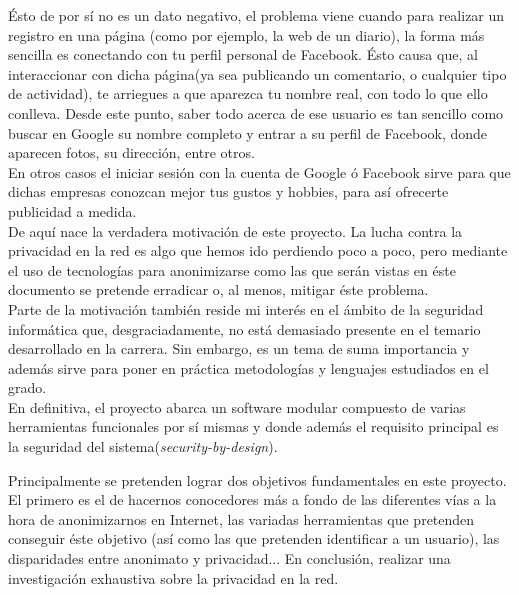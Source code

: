 Ésto de por sí no es un dato negativo, el problema viene cuando para realizar un registro en una página (como por ejemplo, la web de un diario), la forma más sencilla es conectando con tu perfil personal de Facebook. Ésto causa que, al interaccionar con dicha página(ya sea publicando un comentario, o cualquier tipo de actividad), te arriegues a que aparezca tu nombre real, con todo lo que ello conlleva. Desde este punto, saber todo acerca de ese usuario es tan sencillo como buscar en Google su nombre completo y entrar a su perfil de Facebook, donde aparecen fotos, su dirección, entre otros.\\
En otros casos el iniciar sesión con la cuenta de Google ó Facebook sirve para que dichas empresas conozcan mejor tus gustos y hobbies, para así ofrecerte publicidad a medida. \\

De aquí nace la verdadera motivación de este proyecto. La lucha contra la privacidad en la red es algo que hemos ido perdiendo poco a poco, pero mediante el uso de tecnologías para anonimizarse como las que serán vistas en éste documento se pretende erradicar o, al menos, mitigar éste problema.\\

Parte de la motivación también reside mi interés en el ámbito de la seguridad informática que, desgraciadamente, no está demasiado presente en el temario desarrollado en la carrera. Sin embargo, es un tema de suma importancia y además sirve para poner en práctica metodologías y lenguajes estudiados en el grado. \\

En definitiva, el proyecto  abarca un software modular compuesto de varias herramientas funcionales por sí mismas y donde además el requisito principal es la seguridad del sistema(\textit{security-by-design}).



Principalmente se pretenden lograr dos objetivos fundamentales en este proyecto.\\

El primero es el de hacernos conocedores más a fondo de las diferentes vías a la hora de anonimizarnos en Internet, las variadas herramientas que pretenden conseguir éste objetivo (así como las que pretenden identificar a un usuario), las disparidades entre anonimato y privacidad... En conclusión, realizar una investigación exhaustiva sobre la privacidad en la red.\\


